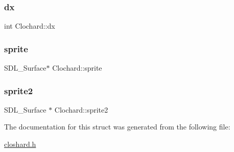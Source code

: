 \mbox{\label{structClochard_a1d43a4487cdf784496d9255a15f1c64e}} 
\subsubsection{\texorpdfstring{dx}{dx}}
{\footnotesize\ttfamily int Clochard\+::dx}

\mbox{\label{structClochard_a34522552cf1d2a44598bac76517e25ca}} 
\subsubsection{\texorpdfstring{sprite}{sprite}}
{\footnotesize\ttfamily S\+D\+L\+\_\+\+Surface$\ast$ Clochard\+::sprite}

\mbox{\label{structClochard_a1db48fc1cb139bdb2ccc18b675b59c60}} 
\subsubsection{\texorpdfstring{sprite2}{sprite2}}
{\footnotesize\ttfamily S\+D\+L\+\_\+\+Surface $\ast$ Clochard\+::sprite2}



The documentation for this struct was generated from the following file\+:\begin{DoxyCompactItemize}
\item 
\hyperlink{closhard_8h}{closhard.\+h}\end{DoxyCompactItemize}

